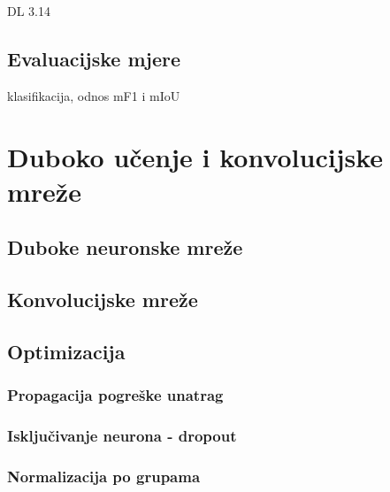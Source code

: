 \documentclass[utf8, diplomski, lmodern]{fer}
\begin{document}
DL 3.14




\section{Evaluacijske mjere}

klasifikacija, odnos mF1 i mIoU

\chapter{Duboko učenje i konvolucijske mreže}


\section{Duboke neuronske mreže}


\section{Konvolucijske mreže}


\section{Optimizacija}

\subsection{Propagacija pogreške unatrag}

\subsection{Isključivanje neurona - dropout}

\subsection{Normalizacija po grupama}
\end{document}
